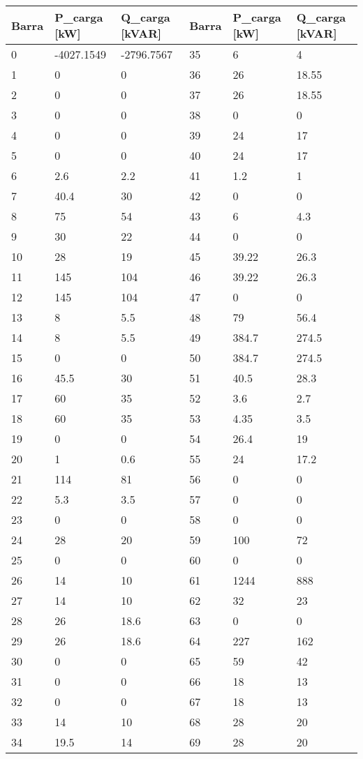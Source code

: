 \begin{tabular}{llllll}
\toprule
\textbf{Barra}&\textbf{P_{carga} [kW]}&\textbf{Q_{carga} [kVAR]}&\textbf{Barra}&\textbf{P_{carga} [kW]}&\textbf{Q_{carga} [kVAR]}\\
\midrule
0&-4027.1549&-2796.7567&35&6&4\\
1&0&0&36&26&18.55\\
2&0&0&37&26&18.55\\
3&0&0&38&0&0\\
4&0&0&39&24&17\\
5&0&0&40&24&17\\
6&2.6&2.2&41&1.2&1\\
7&40.4&30&42&0&0\\
8&75&54&43&6&4.3\\
9&30&22&44&0&0\\
10&28&19&45&39.22&26.3\\
11&145&104&46&39.22&26.3\\
12&145&104&47&0&0\\
13&8&5.5&48&79&56.4\\
14&8&5.5&49&384.7&274.5\\
15&0&0&50&384.7&274.5\\
16&45.5&30&51&40.5&28.3\\
17&60&35&52&3.6&2.7\\
18&60&35&53&4.35&3.5\\
19&0&0&54&26.4&19\\
20&1&0.6&55&24&17.2\\
21&114&81&56&0&0\\
22&5.3&3.5&57&0&0\\
23&0&0&58&0&0\\
24&28&20&59&100&72\\
25&0&0&60&0&0\\
26&14&10&61&1244&888\\
27&14&10&62&32&23\\
28&26&18.6&63&0&0\\
29&26&18.6&64&227&162\\
30&0&0&65&59&42\\
31&0&0&66&18&13\\
32&0&0&67&18&13\\
33&14&10&68&28&20\\
34&19.5&14&69&28&20\\
\bottomrule
\end{tabular}
